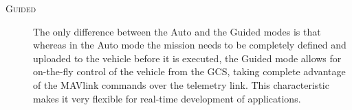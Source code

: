 \begin{description}
	\item[\scshape Guided]
		The only difference between the Auto and the Guided modes is that whereas in the Auto mode the mission needs to be completely defined and uploaded to the vehicle before it is executed, the Guided mode allows for on-the-fly control of the vehicle from the GCS, taking complete advantage of the MAVlink commands over the telemetry link.
		This characteristic makes it very flexible for real-time development of applications.

		
\end{description}





